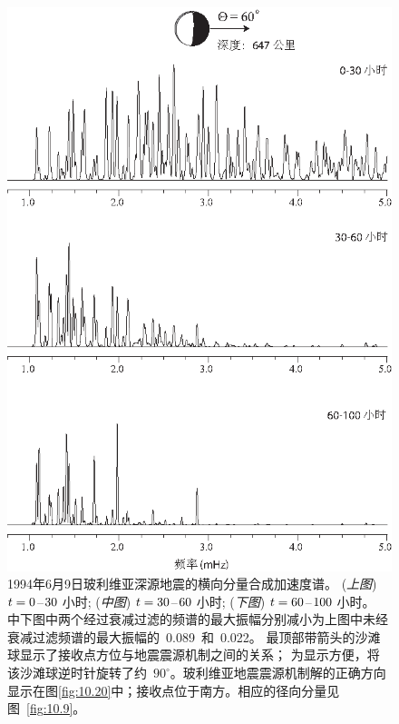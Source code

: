 \begin{figure}
\begin{center}
\includegraphics{../figures/chap10/fig07.eps}
\end{center}
\caption[Bolivia spect1]{
\label{fig:10.7}
1994年6月9日玻利维亚深源地震的横向分量合成加速度谱。
({\em 上图\/}) $t=0\hspace{0.2 mm}$--$\hspace{0.2 mm}30$
小时; 
({\em 中图\/}) $t=30\hspace{0.2 mm}$--$\hspace{0.2 mm}60$
小时;  
({\em 下图\/}) $t=60\hspace{0.2 mm}$--$\hspace{0.2 mm}100$
小时。 
中下图中两个经过衰减过滤的频谱的最大振幅分别减小为上图中未经衰减过滤频谱的最大振幅的~0.089~和~0.022。
最顶部带箭头的沙滩球显示了接收点方位与地震震源机制之间的关系；
为显示方便，将该沙滩球逆时针旋转了约~$90^\circ$。玻利维亚地震震源机制解的正确方向显示在图\ref{fig:10.20}中；接收点位于南方。相应的径向分量见图~\protect\ref{fig:10.9}。}
\end{figure}
